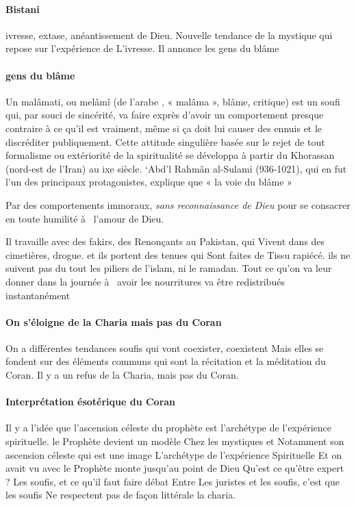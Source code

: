 \paragraph{Bistani} ivresse, extase, anéantissement de Dieu. 
Nouvelle tendance de la mystique qui  repose sur l'expérience de 
L'ivresse. Il annonce les gens du blâme

\paragraph{gens du blâme}
Un malâmati, ou melâmî  (de l’arabe  
 , « malâma », blâme, critique) est un soufi qui, par souci de sincérité, va faire exprès d’avoir un comportement presque contraire à ce qu’il est vraiment, même si ça doit lui causer des ennuis et le discréditer publiquement. Cette attitude singulière basée sur le rejet de tout formalisme ou extériorité de la spiritualité se développa à partir du Khorassan (nord-est de l’Iran) au ixe siècle. ‘Abd’l Rahmân al-Sulami (936-1021), qui en fut l'un des principaux protagonistes, explique que « la voie du blâme »
 
Par des comportements 
immoraux, \textit{sans reconnaissance de Dieu} pour se consacrer en 
toute humilité à  
l'amour de Dieu. 
 
\begin{Ex}
Il travaille avec des fakirs, des 
Renonçants au Pakistan, qui  
Vivent dans des cimetières, drogue. et ils portent des tenues qui  
Sont faites de 
Tissu rapiécé. ils ne suivent pas du 
tout  les piliers de l'islam, ni le  ramadan. 
  Tout ce qu'on va leur donner dans la journée à  avoir les nourritures va être redistribués instantanément   
\end{Ex}

\paragraph{On s'éloigne de la Charia mais pas du Coran}
On a différentes 
tendances 
soufis qui  vont coexister, coexistent 
Mais elles se fondent sur 
des éléments 
communs qui  sont la récitation et 
la méditation 
du Coran. Il y a un refus de la 
Charia, mais pas du 
Coran.  
\paragraph{Interprétation ésotérique du Coran}
Il y a l'idée 
que l'ascension céleste du prophète est 
l'archétype de l'expérience spirituelle. 
 le Prophète devient un modèle 
Chez les mystiques et 
Notamment son ascension céleste qui  est une image 
L'archétype de l'expérience 
Spirituelle  Et on avait vu avec le Prophète monte jusqu'au point de Dieu  Qu'est ce qu'être expert ?
Les soufis, et  ce qu'il faut faire débat 
Entre 
Les juristes et les soufis, c'est que les soufis 
Ne respectent pas 
de façon littérale la charia.

